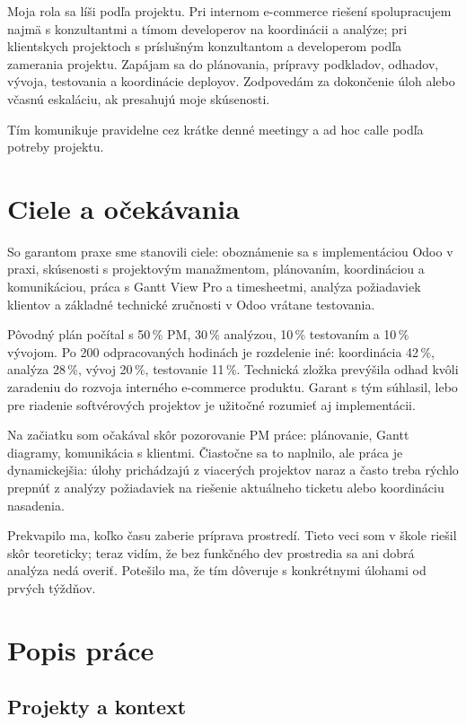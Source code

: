 \documentclass[12pt,a4paper]{article}
\begin{document}
Moja rola sa líši podľa projektu. Pri internom e-commerce riešení spolupracujem najmä s konzultantmi a tímom developerov na koordinácii a analýze; pri klientskych projektoch s príslušným konzultantom a developerom podľa zamerania projektu. Zapájam sa do plánovania, prípravy podkladov, odhadov, vývoja, testovania a koordinácie deployov. Zodpovedám za dokončenie úloh alebo včasnú eskaláciu, ak presahujú moje skúsenosti.

Tím komunikuje pravidelne cez krátke denné meetingy a ad hoc calle podľa potreby projektu.

\section{Ciele a očekávania}

So garantom praxe sme stanovili ciele: oboznámenie sa s implementáciou Odoo v praxi, skúsenosti s projektovým manažmentom, plánovaním, koordináciou a komunikáciou, práca s Gantt View Pro a timesheetmi, analýza požiadaviek klientov a základné technické zručnosti v Odoo vrátane testovania.

Pôvodný plán počítal s 50\,\% PM, 30\,\% analýzou, 10\,\% testovaním a 10\,\% vývojom. Po 200 odpracovaných hodinách je rozdelenie iné: koordinácia 42\,\%, analýza 28\,\%, vývoj 20\,\%, testovanie 11\,\%. Technická zložka prevýšila odhad kvôli zaradeniu do rozvoja interného e-commerce produktu. Garant s tým súhlasil, lebo pre riadenie softvérových projektov je užitočné rozumieť aj implementácii.

Na začiatku som očakával skôr pozorovanie PM práce: plánovanie, Gantt diagramy, komunikácia s klientmi. Čiastočne sa to naplnilo, ale práca je dynamickejšia: úlohy prichádzajú z viacerých projektov naraz a často treba rýchlo prepnúť z analýzy požiadaviek na riešenie aktuálneho ticketu alebo koordináciu nasadenia.

Prekvapilo ma, koľko času zaberie príprava prostredí. Tieto veci som v škole riešil skôr teoreticky; teraz vidím, že bez funkčného dev prostredia sa ani dobrá analýza nedá overiť. Potešilo ma, že tím dôveruje s konkrétnymi úlohami od prvých týždňov.

\section{Popis práce}

\subsection{Projekty a kontext}
\end{document}
